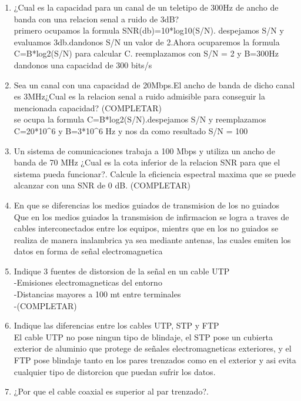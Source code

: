\documentclass{udparticle}
\begin{document}
\begin{enumerate}
    \item  ¿Cual es la capacidad para un canal de un teletipo de 300Hz de ancho de banda con una relacion senal a ruido de 3dB? \\
    		primero ocupamos la formula SNR(db)=10*log10(S/N). despejamos S/N y evaluamos 3db.dandonos S/N un valor de 2.Ahora 
    		ocuparemos la formula C=B*log2(S/N) para calcular C. reemplazamos con S/N = 2 y B=300Hz dandonos una capacidad 
    		de 300 bits/s
    \item Sea un canal con una capacidad de 20Mbps.El ancho de banda de dicho canal es 3MHz¿Cual es la relacion senal a ruido 
    	  admisible para conseguir la mencionada capacidad? (COMPLETAR)\\
    	 	se ocupa la formula C=B*log2(S/N).despejamos S/N y reemplazamos C=20*10^6 y  B=3*10^6 Hz y nos da como resultado 
    	 	S/N = 100
    \item  Un sistema de comunicaciones trabaja a 100 Mbps y utiliza un ancho de banda de 70 MHz ¿Cual es la cota inferior de la relacion SNR para que el sistema pueda funcionar?. Calcule la eﬁciencia espectral maxima que se puede alcanzar con una SNR de 0 dB. (COMPLETAR)\\
    \item En que se diferencias los medios guiados de transmision de los no guiados\\
    Que en los medios guiados la transmision de infirmacion se logra a traves de cables interconectados entre los equipos, mientrs que en los no guiados se realiza de manera inalambrica ya sea mediante antenas, las cuales emiten los datos en forma de señal electromagnetica\\
    \item Indique 3 fuentes de distorsion de la señal en un cable UTP\\
    -Emisiones electromagneticas del entorno\\
    -Distancias mayores a 100 mt entre terminales\\
    -(COMPLETAR)\\
    \item Indique las diferencias entre los cables UTP, STP y FTP\\
    El cable UTP no pose ningun tipo de blindaje, el STP pose un cubierta exterior de aluminio que protege de señales electromagneticas exteriores, y el FTP pose blindaje tanto en los pares trenzados como en el exterior y asi evita cualquier tipo de distorcion que puedan sufrir los datos.\\
    \item  ¿Por que el cable coaxial es superior al par trenzado?.\\

\end{enumerate}
\end{document}
